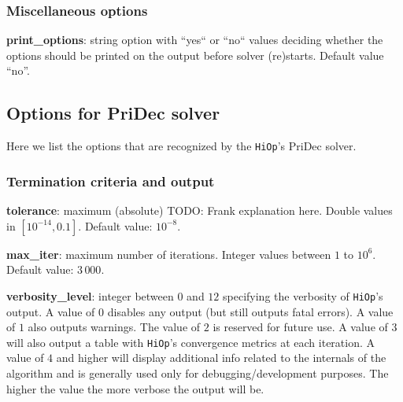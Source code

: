 \documentclass[11pt]{article}
\newcommand{\Hi}{\texttt{HiOp}\xspace}
\begin{document}
\medskip

\subsubsection{Miscellaneous options}

\noindent \textbf{print\_options}: string option with ``yes`` or ``no`` values deciding whether the options should be printed on the output before solver (re)starts. Default value ``no''.


\subsection{Options for PriDec solver}
Here we list the options that are recognized by the \Hi's PriDec solver.

\subsubsection{Termination criteria and output}

\noindent \textbf{tolerance}: maximum (absolute)  TODO: Frank explanation here. Double values in $[10^{-14},0.1]$. Default value: $10^{-8}$. 

\medskip


\medskip

\noindent \textbf{max\_iter}: maximum number of iterations. Integer values between $1$ to $10^6$. Default value: $3\,000$.

\medskip


\medskip

\noindent \textbf{verbosity\_level}: integer between $0$ and $12$ specifying the verbosity of \Hi's output. A value of $0$ disables any output (but still outputs fatal errors). A value of $1$ also outputs warnings. The value of $2$ is reserved for future use. A value of $3$ will also output a table with \Hi's convergence metrics at each iteration. A value of $4$ and higher will display additional info related to the internals of the algorithm and is generally used only for debugging/development purposes. The higher the value the more verbose the output will be.
\end{document}
